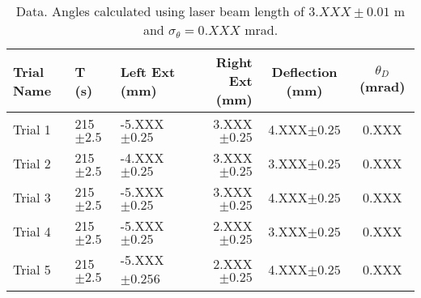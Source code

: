 \begin{table}[H]
	\centering
	\begin{tabular}{| l | l | l | r | c | c |}\hline
		Trial Name & T (s) & Left Ext (mm) & Right Ext (mm) & Deflection (mm) & \(\theta_{D}\) (mrad) \\\hline 
		Trial 1 & 215\(\pm 2.5\) & -5.XXX\(\pm 0.25\) & 3.XXX\(\pm 0.25\) & 4.XXX\(\pm 0.25\)  & 0.XXX \\\hline
		Trial 2 & 215\(\pm 2.5\) & -4.XXX\(\pm 0.25\) & 3.XXX\(\pm 0.25\) & 3.XXX\(\pm 0.25\)  & 0.XXX \\\hline
		Trial 3 & 215\(\pm 2.5\) & -5.XXX\(\pm 0.25\) & 3.XXX\(\pm 0.25\) & 4.XXX\(\pm 0.25\)  & 0.XXX \\\hline
		Trial 4 & 215\(\pm 2.5\) & -5.XXX\(\pm 0.25\) & 2.XXX\(\pm 0.25\) & 3.XXX\(\pm 0.25\) & 0.XXX \\\hline
		Trial 5 & 215\(\pm 2.5\) & -5.XXX\(\pm 0.25\)6 & 2.XXX\(\pm 0.25\) & 4.XXX\(\pm 0.25\) & 0.XXX \\\hline
		\end{tabular}
	\caption{Data. Angles calculated using laser beam length of \(3.XXX\pm 0.01\) m and \(\sigma_{\theta} = 0.XXX\) mrad.} \label{tab:data}
	\end{table}

{}






